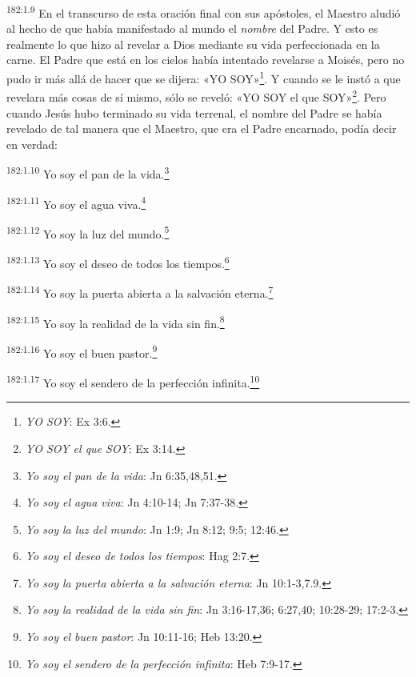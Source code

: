 \par
\textsuperscript{182:1.9} En el transcurso de esta oración final con sus apóstoles, el Maestro aludió al hecho de que había manifestado al mundo el \textit{nombre} del Padre. Y esto es realmente lo que hizo al revelar a Dios mediante su vida perfeccionada en la carne. El Padre que está en los cielos había intentado revelarse a Moisés, pero no pudo ir más allá de hacer que se dijera: «YO SOY»\footnote{\textit{YO SOY}: Ex 3:6.}. Y cuando se le instó a que revelara más cosas de sí mismo, sólo se reveló: «YO SOY el que SOY»\footnote{\textit{YO SOY el que SOY}: Ex 3:14.}. Pero cuando Jesús hubo terminado su vida terrenal, el nombre del Padre se había revelado de tal manera que el Maestro, que era el Padre encarnado, podía decir en verdad:

\par
\textsuperscript{182:1.10} Yo soy el pan de la vida.\footnote{\textit{Yo soy el pan de la vida}: Jn 6:35,48,51.}

\par
\textsuperscript{182:1.11} Yo soy el agua viva.\footnote{\textit{Yo soy el agua viva}: Jn 4:10-14; Jn 7:37-38.}

\par
\textsuperscript{182:1.12} Yo soy la luz del mundo.\footnote{\textit{Yo soy la luz del mundo}: Jn 1:9; Jn 8:12; 9:5; 12:46.}

\par
\textsuperscript{182:1.13} Yo soy el deseo de todos los tiempos.\footnote{\textit{Yo soy el deseo de todos los tiempos}: Hag 2:7.}

\par
\textsuperscript{182:1.14} Yo soy la puerta abierta a la salvación eterna.\footnote{\textit{Yo soy la puerta abierta a la salvación eterna}: Jn 10:1-3,7.9.}

\par
\textsuperscript{182:1.15} Yo soy la realidad de la vida sin fin.\footnote{\textit{Yo soy la realidad de la vida sin fin}: Jn 3:16-17,36; 6:27,40; 10:28-29; 17:2-3.}

\par
\textsuperscript{182:1.16} Yo soy el buen pastor.\footnote{\textit{Yo soy el buen pastor}: Jn 10:11-16; Heb 13:20.}

\par
\textsuperscript{182:1.17} Yo soy el sendero de la perfección infinita.\footnote{\textit{Yo soy el sendero de la perfección infinita}: Heb 7:9-17.}

